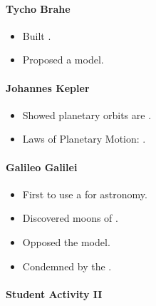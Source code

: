 \documentclass[12pt]{article}
\newcommand{\fillin}[1]{\uline{\hspace{#1}}}
\begin{document}
\paragraph{Tycho Brahe}
\begin{itemize}
  \item Built \fillin{3cm}.
  \item Proposed a \fillin{3cm} model.
\end{itemize}

\paragraph{Johannes Kepler}
\begin{itemize}
  \item Showed planetary orbits are \fillin{2.5cm}.
  \item Laws of Planetary Motion: \fillin{5cm}.
\end{itemize}

\paragraph{Galileo Galilei}
\begin{itemize}
  \item First to use a \fillin{3cm} for astronomy.
  \item Discovered moons of \fillin{3cm}.
  \item Opposed the \fillin{3cm} model.
  \item Condemned by the \fillin{3cm}.
\end{itemize}

\paragraph{Student Activity II}
\end{document}

